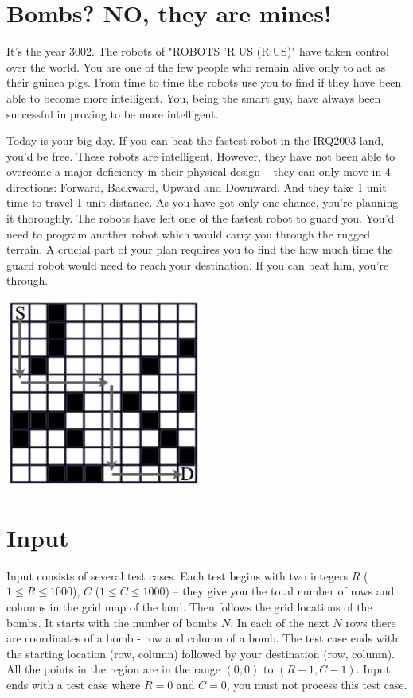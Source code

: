 \documentclass{article}
\begin{document}
\section*{\fontsize{12}{25}Bombs? NO, they are mines!}
It's the year 3002. The robots of "ROBOTS 'R US (R:US)" have taken control over the world. You are one of the few people who remain alive only to act as their guinea pigs. From time to time the robots use you to find if they have been able to become more intelligent. You, being the smart guy, have always been successful in proving to be more intelligent.

Today is your big day. If you can beat the fastest robot in the IRQ2003 land, you'd be free. These robots are intelligent. However, they have not been able to overcome a major deficiency in their physical design -- they can only move in 4 directions: Forward, Backward, Upward and Downward. And they take 1 unit time to travel 1 unit distance. As you have got only one chance, you're planning it thoroughly. The robots have left one of the fastest robot to guard you. You'd need to program another robot which would carry you through the rugged terrain. A crucial part of your plan requires you to find the how much time the guard robot would need to reach your destination. If you can beat him, you're through.

\includegraphics{problem-image1.jpg}

\section*{Input}
Input consists of several test cases. Each test begins with two integers $R$ ($1 \leq R \leq 1000$), $C$ ($1 \leq C \leq 1000$) -- they give you the total number of rows and columns in the grid map of the land. Then follows the grid locations of the bombs. It starts with the number of bombs $N$. In each of the next $N$ rows there are coordinates of a bomb - row and column of a bomb. The test case ends with the starting location (row, column) followed by your destination (row, column). All the points in the region are in the range $(0,0)$ to $(R-1, C-1)$. Input ends with a test case where $R = 0$ and $C = 0$, you must not process this test case.
\end{document}
